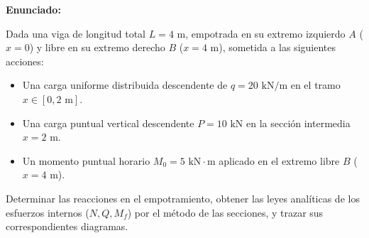 \textbf{Enunciado:}



Dada una viga de longitud total $L = 4\text{ m}$, empotrada en su extremo izquierdo $A$ ($x = 0$) y libre en su extremo derecho $B$ ($x = 4\text{ m}$), sometida a las siguientes acciones:

\begin{itemize}

    \item Una carga uniforme distribuida descendente de $q = 20\text{ kN/m}$ en el tramo $x \in [0, 2\text{ m}]$.

    \item Una carga puntual vertical descendente $P = 10\text{ kN}$ en la sección intermedia $x = 2\text{ m}$.

    \item Un momento puntual horario $M_0 = 5\text{ kN}\cdot\text{m}$ aplicado en el extremo libre $B$ ($x = 4\text{ m}$).

\end{itemize}



Determinar las reacciones en el empotramiento, obtener las leyes analíticas de los esfuerzos internos ($N, Q, M_f$) por el método de las secciones, y trazar sus correspondientes diagramas.



